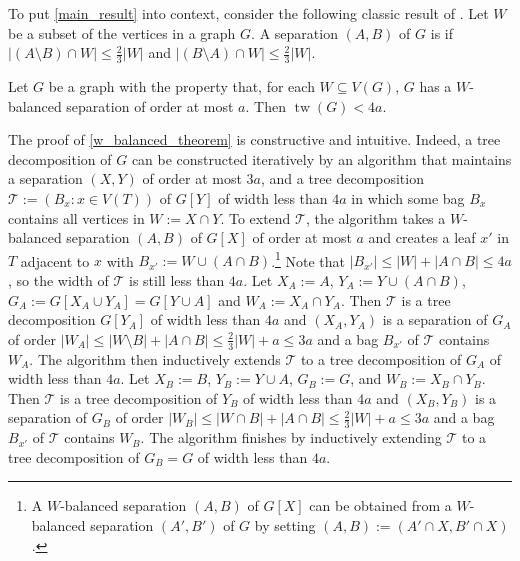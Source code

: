 \documentclass{patmorin}
\DeclareMathOperator{\tw}{tw}
\begin{document}
To put \cref{main_result} into context, consider the following classic result of \citet{robertson.seymour:graph}.
Let $W$ be a subset of the vertices in a graph $G$.  A separation $(A,B)$ of $G$ is  if $|(A\setminus B)\cap W|\le \tfrac{2}{3}|W|$ and $|(B\setminus A)\cap W|\le \tfrac{2}{3}|W|$.

\begin{thm}\label{w_balanced_theorem}
    Let $G$ be a graph with the property that, for each $W\subseteq V(G)$, $G$ has a $W$-balanced separation of order at most $a$. Then  $\tw(G)<4a$.
\end{thm}

The proof of \cref{w_balanced_theorem} is constructive and intuitive.  Indeed, a tree decomposition of $G$ can be constructed iteratively by an algorithm that maintains a separation $(X,Y)$ of order at most $3a$, and a tree decomposition $\mathcal{T}:=(B_x:x\in V(T))$ of $G[Y]$ of width less than $4a$ in which some bag $B_x$ contains all vertices in $W:=X\cap Y$.  To extend $\mathcal{T}$, the algorithm takes a $W$-balanced separation $(A,B)$ of $G[X]$ of order at most $a$ and creates a leaf $x'$ in $T$ adjacent to $x$ with $B_{x'}:=W\cup (A\cap B)$.\footnote{A $W$-balanced separation $(A,B)$ of $G[X]$ can be obtained from a $W$-balanced separation $(A',B')$ of $G$ by setting $(A,B):=(A'\cap X,B'\cap X)$.}  Note that $|B_{x'}|\le |W|+|A\cap B|\le 4a$, so the width of $\mathcal{T}$ is still less than $4a$.
Let $X_A:=A$, $Y_A:=Y\cup(A\cap B)$, $G_A:=G[X_A\cup Y_A]=G[Y\cup A]$ and $W_A:=X_A\cap Y_A$.  Then $\mathcal{T}$ is a tree decomposition $G[Y_A]$ of width less than $4a$ and $(X_A,Y_A)$ is a separation of $G_A$ of order $|W_A|\le|W\setminus B|+|A\cap B|\le \tfrac{2}{3}|W|+a\le 3a$ and a bag $B_{x'}$ of $\mathcal{T}$ contains $W_A$. The algorithm then inductively extends $\mathcal{T}$ to a tree decomposition of $G_A$ of width less than $4a$.  Let $X_B:=B$, $Y_B:=Y\cup A$, $G_B:=G$, and $W_B:=X_B\cap Y_B$.  Then $\mathcal{T}$ is a tree decomposition of $Y_B$ of width less than $4a$ and $(X_B,Y_B)$ is a separation of $G_B$ of order $|W_B|\le |W\cap B|+|A\cap B|\le\tfrac{2}{3}|W|+a\le 3a$ and a bag $B_{x'}$ of $\mathcal{T}$ contains $W_B$.  The algorithm finishes by inductively extending $\mathcal{T}$ to a tree decomposition of $G_B=G$ of width less than $4a$.

\end{document}
